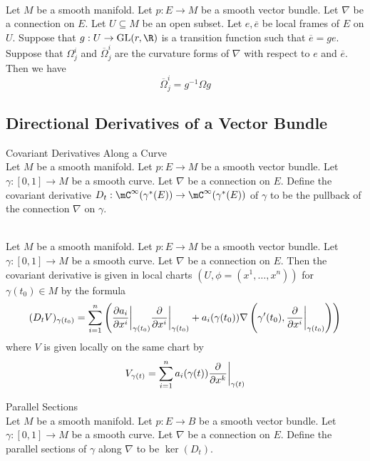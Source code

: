 \documentclass[a4paper]{article}
\begin{document}
\begin{prp}{}{}\\
Let $M$ be a smooth manifold. Let $p:E\to M$ be a smooth vector bundle. Let $\nabla$ be a connection on $E$. Let $U\subseteq M$ be an open subset. Let $e,\overline{e}$ be local frames of $E$ on $U$. Suppose that $g:U\to\text{GL}(r,\R)$ is a transition function such that $\overline{e}=ge$. Suppose that $\Omega_j^i$ and $\overline{\Omega}_j^i$ are the curvature forms of $\nabla$ with respect to $e$ and $\overline{e}$. Then we have $$\overline{\Omega}_j^i=g^{-1}\Omega g$$
\end{prp}

\subsection{Directional Derivatives of a Vector Bundle}
\begin{defn}{Covariant Derivatives Along a Curve}{}\\
Let $M$ be a smooth manifold. Let $p:E\to M$ be a smooth vector bundle. Let $\gamma:[0,1]\to M$ be a smooth curve. Let $\nabla$ be a connection on $E$. Define the covariant derivative $D_t:\mC^\infty(\gamma^\ast(E))\to\mC^\infty(\gamma^\ast(E))$ of $\gamma$ to be the pullback of the connection $\nabla$ on $\gamma$. 
\end{defn}

\begin{prp}{}{}\\
Let $M$ be a smooth manifold. Let $p:E\to M$ be a smooth vector bundle. Let $\gamma:[0,1]\to M$ be a smooth curve. Let $\nabla$ be a connection on $E$. Then the covariant derivative is given in local charts $(U,\phi=(x^1,\dots,x^n))$ for $\gamma(t_0)\in M$ by the formula $$(D_tV)_{\gamma(t_0)}=\sum_{i=1}^n\left(\frac{\partial a_i}{\partial x^i}\bigg{|}_{\gamma(t_0)}\frac{\partial}{\partial x^i}\bigg{|}_{\gamma(t_0)}+a_i(\gamma(t_0))\nabla\left(\gamma'(t_0),\frac{\partial}{\partial x^i}\bigg{|}_{\gamma(t_0)}\right)\right)$$ where $V$ is given locally on the same chart by $$V_{\gamma(t)}=\sum_{i=1}^na_i(\gamma(t))\frac{\partial}{\partial x^k}\bigg{|}_{\gamma(t)}$$
\end{prp}

\begin{defn}{Parallel Sections}{}\\
Let $M$ be a smooth manifold. Let $p:E\to B$ be a smooth vector bundle. Let $\gamma:[0,1]\to M$ be a smooth curve. Let $\nabla$ be a connection on $E$. Define the parallel sections of $\gamma$ along $\nabla$ to be $\ker(D_t)$. 
\end{defn}
\end{document}
